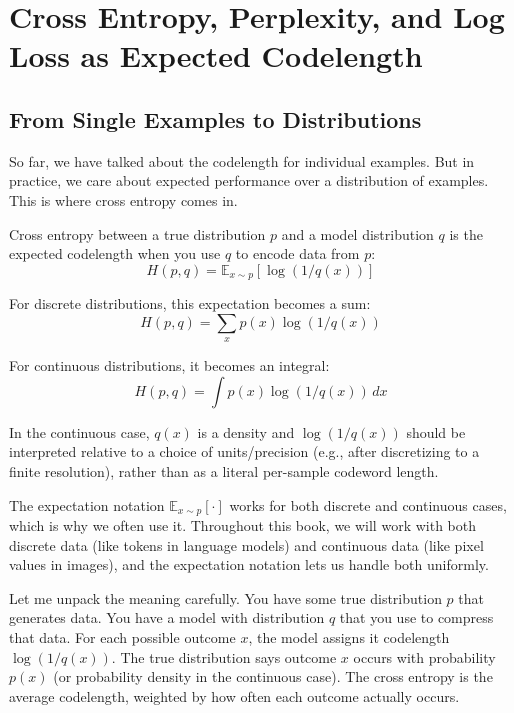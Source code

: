 \section{Cross Entropy, Perplexity, and Log Loss as Expected Codelength}

\subsection{From Single Examples to Distributions}

So far, we have talked about the codelength for individual examples. But in practice, we care about expected performance over a distribution of examples. This is where cross entropy comes in.

Cross entropy between a true distribution $p$ and a model distribution $q$ is the expected codelength when you use $q$ to encode data from $p$:
\begin{equation}
H(p, q) = \mathbb{E}_{x \sim p}\left[\log(1/q(x))\right]
\end{equation}

For discrete distributions, this expectation becomes a sum:
\begin{equation}
H(p, q) = \sum_{x} p(x) \log(1/q(x))
\end{equation}

For continuous distributions, it becomes an integral:
\begin{equation}
H(p, q) = \int p(x) \log(1/q(x)) \, dx
\end{equation}

In the continuous case, $q(x)$ is a density and $\log(1/q(x))$ should be interpreted relative to a choice of units/precision (e.g., after discretizing to a finite resolution), rather than as a literal per-sample codeword length.

The expectation notation $\mathbb{E}_{x \sim p}[\cdot]$ works for both discrete and continuous cases, which is why we often use it. Throughout this book, we will work with both discrete data (like tokens in language models) and continuous data (like pixel values in images), and the expectation notation lets us handle both uniformly.

Let me unpack the meaning carefully. You have some true distribution $p$ that generates data. You have a model with distribution $q$ that you use to compress that data. For each possible outcome $x$, the model assigns it codelength $\log(1/q(x))$. The true distribution says outcome $x$ occurs with probability $p(x)$ (or probability density in the continuous case). The cross entropy is the average codelength, weighted by how often each outcome actually occurs.

